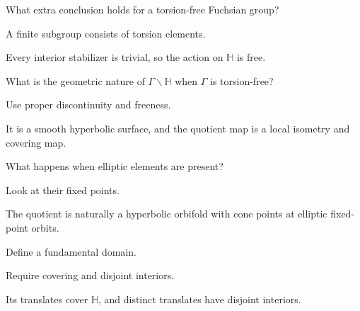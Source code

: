 \begin{exercise}\label{exr:vii35-05}
What extra conclusion holds for a torsion-free Fuchsian group?
\end{exercise}

\begin{hint}
A finite subgroup consists of torsion elements.
\end{hint}

\begin{solution}
Every interior stabilizer is trivial, so the action on \(\mathbb H\) is free.
\end{solution}

\begin{exercise}\label{exr:vii35-06}
What is the geometric nature of \(\Gamma\backslash\mathbb H\) when \(\Gamma\) is torsion-free?
\end{exercise}

\begin{hint}
Use proper discontinuity and freeness.
\end{hint}

\begin{solution}
It is a smooth hyperbolic surface, and the quotient map is a local isometry and covering map.
\end{solution}

\begin{exercise}\label{exr:vii35-07}
What happens when elliptic elements are present?
\end{exercise}

\begin{hint}
Look at their fixed points.
\end{hint}

\begin{solution}
The quotient is naturally a hyperbolic orbifold with cone points at elliptic fixed-point orbits.
\end{solution}

\begin{exercise}\label{exr:vii35-08}
Define a fundamental domain.
\end{exercise}

\begin{hint}
Require covering and disjoint interiors.
\end{hint}

\begin{solution}
Its translates cover \(\mathbb H\), and distinct translates have disjoint interiors.
\end{solution}

